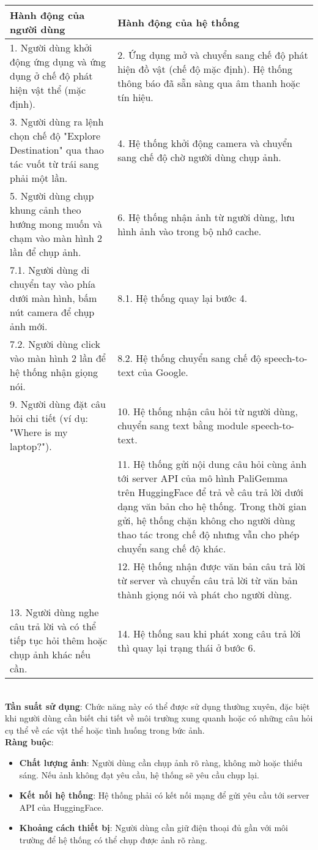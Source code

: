 \documentclass[a4paper,12pt]{article}
\begin{document}
\begin{longtable}{|p{6cm}|p{8cm}|}
\hline
\textbf{Hành động của người dùng} & \textbf{Hành động của hệ thống} \\
\hline
1. Người dùng khởi động ứng dụng và ứng dụng ở chế độ phát hiện vật thể (mặc định). & 
2. Ứng dụng mở và chuyển sang chế độ phát hiện đồ vật (chế độ mặc định). Hệ thống thông báo đã sẵn sàng qua âm thanh hoặc tín hiệu. \\
\hline
3. Người dùng ra lệnh chọn chế độ "Explore Destination" qua thao tác vuốt từ trái sang phải một lần. & 
4. Hệ thống khởi động camera và chuyển sang chế độ chờ người dùng chụp ảnh. \\
\hline
5. Người dùng chụp khung cảnh theo hướng mong muốn và chạm vào màn hình 2 lần để chụp ảnh. & 
6. Hệ thống nhận ảnh từ người dùng, lưu hình ảnh vào trong bộ nhớ cache. \\
\hline
7.1. Người dùng di chuyển tay vào phía dưới màn hình, bấm nút camera để chụp ảnh mới. & 
8.1. Hệ thống quay lại bước 4. \\
\hline
7.2. Người dùng click vào màn hình 2 lần để hệ thống nhận giọng nói. & 
8.2. Hệ thống chuyển sang chế độ speech-to-text của Google. \\
\hline
9. Người dùng đặt câu hỏi chi tiết (ví dụ: "Where is my laptop?"). & 
10. Hệ thống nhận câu hỏi từ người dùng, chuyển sang text bằng module speech-to-text. \\
\hline
& 11. Hệ thống gửi nội dung câu hỏi cùng ảnh tới server API của mô hình PaliGemma trên HuggingFace để trả về câu trả lời dưới dạng văn bản cho hệ thống. Trong thời gian gửi, hệ thống chặn không cho người dùng thao tác trong chế độ nhưng vẫn cho phép chuyển sang chế độ khác. \\
\hline
& 12. Hệ thống nhận được văn bản câu trả lời từ server và chuyển câu trả lời từ văn bản thành giọng nói và phát cho người dùng. \\
\hline
13. Người dùng nghe câu trả lời và có thể tiếp tục hỏi thêm hoặc chụp ảnh khác nếu cần. & 
14. Hệ thống sau khi phát xong câu trả lời thì quay lại trạng thái ở bước 6. \\
\hline
\end{longtable}
\\
\textbf{Tần suất sử dụng}: Chức năng này có thể được sử dụng thường xuyên, đặc biệt khi người dùng cần biết chi tiết về môi trường xung quanh hoặc có những câu hỏi cụ thể về các vật thể hoặc tình huống trong bức ảnh.
\\
\textbf{Ràng buộc}:
\begin{itemize}
    \item \textbf{Chất lượng ảnh}: Người dùng cần chụp ảnh rõ ràng, không mờ hoặc thiếu sáng. Nếu ảnh không đạt yêu cầu, hệ thống sẽ yêu cầu chụp lại.
    \item \textbf{Kết nối hệ thống}: Hệ thống phải có kết nối mạng để gửi yêu cầu tới server API của HuggingFace.
    \item \textbf{Khoảng cách thiết bị}: Người dùng cần giữ điện thoại đủ gần với môi trường để hệ thống có thể chụp được ảnh rõ ràng.
\end{itemize}
\end{document}
